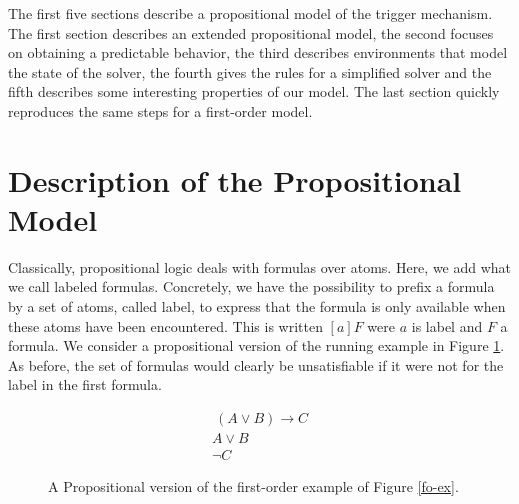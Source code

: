 \documentclass[a4paper,11pt]{article}
\begin{document}
The first five sections describe a propositional model of the trigger mechanism. The first section
describes an extended propositional model, the second focuses on obtaining a predictable behavior,
the third describes environments that model the state of the solver, the fourth gives the rules for a
simplified solver and the fifth describes some interesting properties of our model.
The last section quickly reproduces the same steps for a first-order model.
\section{Description of the Propositional Model}
Classically, propositional logic deals with formulas over atoms.
Here, we add what we call labeled formulas.
Concretely, we have the possibility to prefix a formula by a set of atoms, called label, to express
that the formula is only available when these atoms have been encountered. This is written $[a]F$
were $a$ is label and $F$ a formula.
We consider a propositional version of the running example in Figure \ref{p-ex}. As before, the set
of formulas would clearly be unsatisfiable if it were not for the label in the first formula.

\begin{figure}
\begin{eqnarray*}
 [A]~(A\vee B)\rightarrow C\\
 A\vee B\\
 \neg C
\end{eqnarray*}
\caption{\label{p-ex}A Propositional version of the first-order example of Figure \ref{fo-ex}.}
\end{figure}
\end{document}
